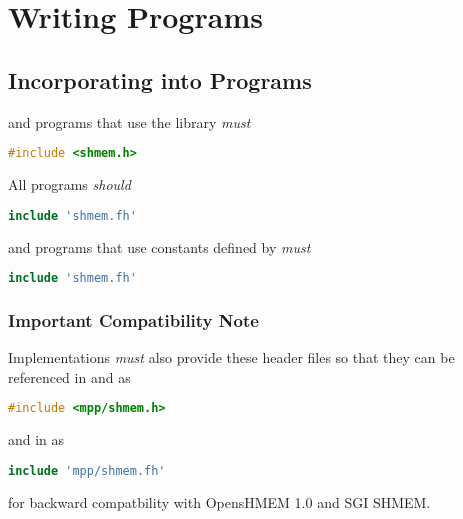\section{Writing \openshmem{} Programs}

\subsection*{Incorporating \openshmem{} into Programs}


\Clang{} and \Cpp{} programs that use the \openshmem library \emph{must}

\begin{lstlisting}[language=C++]
#include <shmem.h>
\end{lstlisting}

All \Fortran{} \openshmem programs \emph{should}

\begin{lstlisting}[language=Fortran]
include 'shmem.fh'
\end{lstlisting}

and \Fortran{} \openshmem programs that use constants defined by \openshmem
\emph{must}

\begin{lstlisting}[language=Fortran]
include 'shmem.fh'
\end{lstlisting}

\subsubsection*{\textbf{Important Compatibility Note}}

Implementations \emph{must} also provide these header files so that
they can be referenced in \Clang{} and \Cpp{} as

\begin{lstlisting}[language=C++]
#include <mpp/shmem.h>
\end{lstlisting}

and in \Fortran{} as

\begin{lstlisting}[language=Fortran]
include 'mpp/shmem.fh'
\end{lstlisting}

for backward compatbility with OpensHMEM 1.0 and SGI SHMEM.

